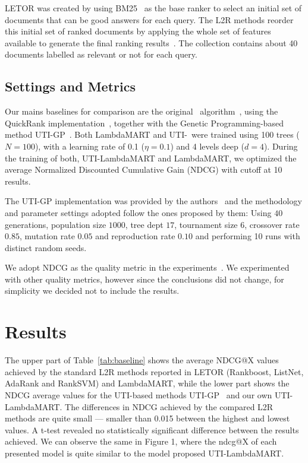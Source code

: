 \documentclass[preprint,review,10pt,3p]{elsarticle}
\begin{document}
LETOR  was created by using BM25~\cite{robertson1994some} as the base ranker to select an initial set of documents that can be good answers for each query. The L2R methods reorder  this initial set of ranked documents by applying the whole set of features available to generate the final ranking results~\cite{cambazoglu2010early}. The collection contains about 40 documents labelled as relevant or not for each query.


\subsection{Settings and Metrics}
\label{sec:lsett}

Our mains baselines for comparison are the original \lambdamart\ algorithm~\cite{wu2010lambdamart}, using the QuickRank implementation~\cite{capannini2016quality}, together with the Genetic Programming-based method UTI-GP~\cite{costa2012lepref}. Both LambdaMART and UTI-\lambdamart\ were trained using 100 trees ($N=100$), with a learning rate of 0.1 ($\eta=0.1$) and 4 levels deep ($d=4$). During the training of both, UTI-LambdaMART and LambdaMART, we optimized the average Normalized Discounted Cumulative Gain (NDCG) with cutoff at 10 results.

The UTI-GP implementation was provided by the authors~\cite{costa2012lepref} and the methodology and parameter settings adopted follow the ones proposed by them: Using $40$ generations, population size $1000$, tree dept $17$, tournament size $6$, crossover rate $0.85$, mutation rate $0.05$ and reproduction rate $0.10$ and performing 10 runs with distinct random seeds. 
 
We adopt NDCG as the quality metric in the experiments~\cite{baezaribeiro2011modinforet}. We experimented with other quality metrics, however since the conclusions did not change, for simplicity we decided not to include the results.

\section{Results}
\label{results}

The upper part of Table~\ref{tab:baseline} shows the average NDCG@X values achieved by the standard L2R methods reported in LETOR (Rankboost, ListNet, AdaRank and RankSVM) and LambdaMART, while the lower part shows the NDCG average values for the UTI-based methods UTI-GP~\cite{costa2012lepref} and our own UTI-LambdaMART. The differences in NDCG achieved by the compared L2R methods are quite small --- smaller than 0.015 between the highest and lowest values. A t-test revealed no statistically significant difference between the results achieved. We can observe the same in Figure 1, where the ndcg@X of each presented model is quite similar to the model proposed UTI-LambdaMART. 
\end{document}
